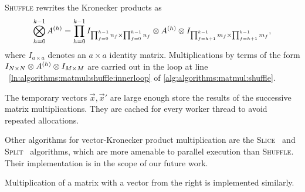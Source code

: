 \begin{itemize}
  \textsc{Shuffle} rewrites the Kronecker products as
  \begin{equation}
    \bigotimes_{h = 0}^{k - 1} A^{(h)} = \prod_{h = 0}^{k - 1}
    I_{\prod_{f = 0}^{h - 1} n_f \times \prod_{f = 0}^{h - 1} n_f} \otimes
    A^{(h)} \otimes I_{\prod_{f = h + 1}^{k - 1} m_f \times
      \prod_{f = h + 1}^{k - 1} m_f} \text,
  \end{equation}
  where $I_{a \times a}$ denotes an $a \times a$ identity matrix.
  Multiplications by terms of the form
  $I_{N \times N} \otimes A^{(h)} \otimes I_{M \times M}$ are
  carried out in the loop at line%
  ~\ref{ln:algorithms:matmul:shuffle:innerloop} of
  \cref{alg:algorithms:matmul:shuffle}.

  The temporary vectors $\vec{x}, \vec{x}'$ are large enough store the
  results of the successive matrix multiplications. They are cached
  for every worker thread to avoid repeated allocations.

  Other algorithms for vector-Kronecker product multiplication are the
  \textsc{Slice}~\citep{fernandes2005alternative} and \textsc{Split}~%
  \citep{DBLP:conf/springsim/CzeksterRFLW10} algorithms, which are
  more amenable to parallel execution than \textsc{Shuffle}. Their
  implementation is in the scope of our future work.
\end{itemize}
Multiplication of a matrix with a vector from the right is implemented
similarly.